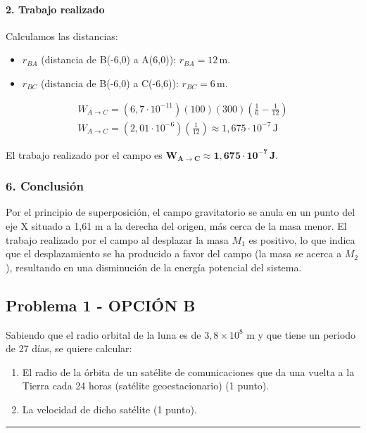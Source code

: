 \paragraph*{2. Trabajo realizado}
Calculamos las distancias:
\begin{itemize}
    \item $r_{BA}$ (distancia de B(-6,0) a A(6,0)): $r_{BA} = 12\,\text{m}$.
    \item $r_{BC}$ (distancia de B(-6,0) a C(-6,6)): $r_{BC} = 6\,\text{m}$.
\end{itemize}
\begin{gather}
    W_{A \to C} = (6,7\cdot10^{-11})(100)(300) \left( \frac{1}{6} - \frac{1}{12} \right) \\
    W_{A \to C} = (2,01\cdot10^{-6}) \left( \frac{1}{12} \right) \approx 1,675\cdot10^{-7}\,\text{J}
\end{gather}
\begin{cajaresultado}
    El trabajo realizado por el campo es $\boldsymbol{W_{A \to C} \approx 1,675 \cdot 10^{-7}\,\textbf{J}}$.
\end{cajaresultado}

\subsubsection*{6. Conclusión}
\begin{cajaconclusion}
Por el principio de superposición, el campo gravitatorio se anula en un punto del eje X situado a 1,61 m a la derecha del origen, más cerca de la masa menor. El trabajo realizado por el campo al desplazar la masa $M_1$ es positivo, lo que indica que el desplazamiento se ha producido a favor del campo (la masa se acerca a $M_2$), resultando en una disminución de la energía potencial del sistema.
\end{cajaconclusion}

\newpage

\subsection{Problema 1 - OPCIÓN B}
\label{subsec:1B_2007_jun_ord}

\begin{cajaenunciado}
Sabiendo que el radio orbital de la luna es de $3,8\times10^{8}$ m y que tiene un periodo de 27 días, se quiere calcular:
\begin{enumerate}
    \item El radio de la órbita de un satélite de comunicaciones que da una vuelta a la Tierra cada 24 horas (satélite geoestacionario) (1 punto).
    \item La velocidad de dicho satélite (1 punto).
\end{enumerate}
\end{cajaenunciado}
\hrule

